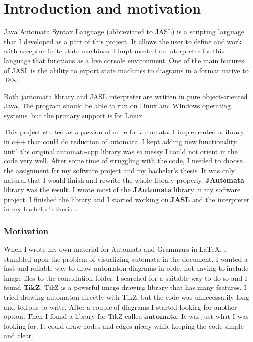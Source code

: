 \documentclass{ctuthesis}
\begin{document}
\maketitle

\chapter{Introduction and motivation}
Java Automata Syntax Language (abbreviated to JASL) is a scripting language that I developed as a part of this project. It allows the user to define and work with acceptor finite state machines. I implemented an interpreter for this language that functions as a live console environment. One of the main features of JASL is the ability to export state machines to diagrams in a format native to \TeX.

Both jautomata library and JASL interpreter are written in pure object-oriented Java. The program should be able to run on Linux and Windows operating systems, but the primary support is for Linux.

This project started as a passion of mine for automata. I implemented a library in c++ that could do reduction of automata. I kept adding new functionality until the original automata-cpp library was so messy I could not orient in the code very well. After some time of struggling with the code, I needed to choose the assignment for my software project and my bachelor's thesis. It was only natural that I would finish and rewrite the whole library properly. \textbf{JAutomata} library was the result. I wrote most of the \textbf{JAutomata} library in my software project. I finished the library and I started working on \textbf{JASL} and the interpreter in my bachelor's thesis . 

\subsection{Motivation}

When I wrote my own material for Automata and Grammars in \LaTeX, I stumbled upon the problem of visualizing automata in the document. I wanted a fast and reliable way to draw automaton diagrams in code, not having to include image files to the compilation folder. I searched for a suitable way to do so and I found \textbf{TikZ}. TikZ is a powerful image drawing library that has many features. I tried drawing automaton directly with TikZ, but the code was unnecessarily long and tedious to write. After a couple of diagrams I started looking for another option. Then I found a library for TikZ called \textbf{automata}. It was just what I was looking for. It could draw nodes and edges nicely while keeping the code simple and clear. 
\end{document}
